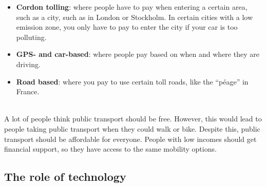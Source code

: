 \documentclass[../summary.tex]{subfiles}
\begin{document}
	\begin{itemize}
		\setlength{\itemsep}{0pt}
		\item \textbf{Cordon tolling}: where people have to pay when entering a certain area, such as a city, such as in London or Stockholm. In certain cities with a low emission zone, you only have to pay to enter the city if your car is too polluting.
		\item \textbf{GPS- and car-based}: where people pay based on when and where they are driving.
		\item \textbf{Road based}: where you pay to use certain toll roads, like the “péage” in France.
	\end{itemize}

	\ \\
	A lot of people think public transport should be free. However, this would lead to people taking public transport when they could walk or bike. Despite this, public transport should be affordable for everyone. People with low incomes should get financial support, so they have access to the same mobility options.
	
	\subsection{The role of technology}
	
\end{document}
